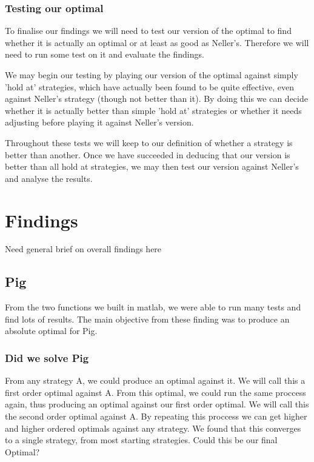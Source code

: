 \documentclass[a4paper,titlepage]{article}
\begin{document}
\subsubsection{Testing our optimal}
To finalise our findings we will need to test our version of the optimal to find whether it is actually an optimal or at least as good as Neller’s\citep{neller2004optimal}. Therefore we will need to run some test on it and evaluate the findings.

We may begin our testing by playing our version of the optimal against simply 'hold at' strategies, which have actually been found to be quite effective, even against Neller’s strategy (though not better than it). By doing this we can decide whether it is actually better than simple 'hold at' strategies or whether it needs adjusting before playing it against Neller’s version.

Throughout these tests we will keep to our definition of whether a strategy is better than another. Once we have succeeded in deducing that our version is better than all hold at strategies, we may then test our version against Neller’s and analyse the results.

\section{Findings}

Need general brief on overall findings here

\subsection{Pig}

From the two functions we built in matlab, we were able to run many tests and find lots of results. The main objective from these finding was to produce an absolute optimal for Pig.

\subsubsection{Did we solve Pig}

From any strategy A, we could produce an optimal against it. We will call this a first order optimal against A. From this optimal, we could run the same proccess again, thus producing an optimal against our first order optimal. We will call this the second order optimal against A. By repeating this proccess we can get higher and higher ordered optimals against any strategy. We found that this converges to a single strategy, from most starting strategies. Could this be our final Optimal?
\end{document}
